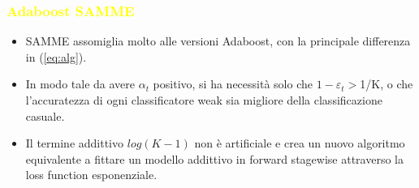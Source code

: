 \documentclass[handout
]{beamer}
\def\yellow#1{{\textcolor{yellow}{#1}}}
\begin{document}
\begin{frame}
\frametitle{\yellow{Adaboost SAMME}}
\begin{itemize}
 \item SAMME assomiglia molto alle versioni Adaboost, con la principale differenza in (\ref{eq:alg}).
 \item In modo tale da avere \begin{math}\alpha_t\end{math} positivo, 
si ha necessit\`a solo che \begin{math}1-\varepsilon_t >\end{math}1/K, o che l'accuratezza di 
ogni classificatore weak sia migliore della classificazione casuale.
\item Il termine addittivo \begin{math}
                            log(K-1)
                           \end{math} non \`e artificiale e crea un nuovo algoritmo 
equivalente a fittare un modello addittivo in forward 
stagewise attraverso la loss function esponenziale.
 
\end{itemize}
\end{frame}
\end{document}
